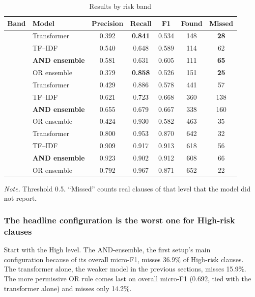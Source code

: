 \begin{table}[!htbp]
\centering
\caption{Results by risk band}
\label{tab:riskeval}
\small
\begin{adjustbox}{max width=\textwidth}
\begin{tabular}{llccccc}
\toprule
\textbf{Band} & \textbf{Model} & \textbf{Precision} & \textbf{Recall} & \textbf{F1} & \textbf{Found} & \textbf{Missed}\\
\midrule
{}
 & Transformer  & 0.392 & \textbf{0.841} & 0.534 & 148 & \textbf{28}\\
 & TF--IDF      & 0.540 & 0.648 & 0.589 & 114 & 62\\
 & \textbf{AND ensemble} & 0.581 & 0.631 & 0.605 & 111 & \textbf{65}\\
 & OR ensemble  & 0.379 & \textbf{0.858} & 0.526 & 151 & \textbf{25}\\
\addlinespace
{}
 & Transformer  & 0.429 & 0.886 & 0.578 & 441 & 57\\
 & TF--IDF      & 0.621 & 0.723 & 0.668 & 360 & 138\\
 & \textbf{AND ensemble} & 0.655 & 0.679 & 0.667 & 338 & 160\\
 & OR ensemble  & 0.424 & 0.930 & 0.582 & 463 & 35\\
\addlinespace
{}
 & Transformer  & 0.800 & 0.953 & 0.870 & 642 & 32\\
 & TF--IDF      & 0.909 & 0.917 & 0.913 & 618 & 56\\
 & \textbf{AND ensemble} & 0.923 & 0.902 & 0.912 & 608 & 66\\
 & OR ensemble  & 0.792 & 0.967 & 0.871 & 652 & 22\\
\bottomrule
\end{tabular}
\end{adjustbox}

{\footnotesize\singlespacing \emph{Note.} Threshold 0.5. ``Missed'' counts real clauses of that level that the model did not report.\par}
\end{table}

\subsubsection{The headline configuration is the worst one for High-risk clauses}
Start with the High level. The AND-ensemble, the first setup's main configuration because of its overall micro-F1, misses 36.9\% of High-risk clauses. The transformer alone, the weaker model in the previous sections, misses 15.9\%. The more permissive OR rule comes last on overall micro-F1 (0.692, tied with the transformer alone) and misses only 14.2\%.

